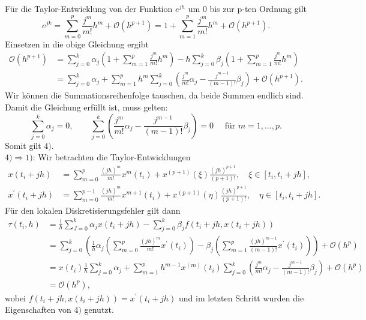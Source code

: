 Für die Taylor-Entwicklung von der Funktion $e^{jh}$ um $0$ bis zur p-ten Ordnung gilt
\[
    e^{jk} = \sum_{m=0}^{p} \frac{j^m}{m!}h^m + \mathcal{O}(h^{p+1})
    = 1 + \sum_{m=1}^{p} \frac{j^m}{m!}h^m + \mathcal{O}(h^{p+1}).
\]
Einsetzen in die obige Gleichung ergibt
\begin{align*}
    \mathcal{O}(h^{p+1})
    &= \sum_{j=0}^{k} \alpha_j  \left( 1 + \sum_{m=1}^{p} \frac{j^m}{m!}h^m \right)
    - h \sum_{j=0}^{k} \beta_j  \left( 1 + \sum_{m=1}^{p} \frac{j^m}{m!}h^m \right) \\
    &= \sum_{j=0}^{k}\alpha_j + \sum_{m=1}^{p} h^{m} \sum_{j=0}^{k}
    \left( \frac{j^m}{m!} \alpha_j - \frac{j^{m-1}}{(m-1)!}\beta_j \right) + \mathcal{O}(h^{p+1}).
\end{align*}
Wir können die Summationsreihenfolge tauschen, da beide Summen endlich sind. Damit die Gleichung erfüllt ist, muss
gelten:
\[
    \sum_{j=0}^{k} \alpha_j = 0, \qquad
    \sum_{j=0}^{k} \left( \frac{j^m}{m!}\alpha_j - \frac{j^{m-1}}{(m-1)!}\beta_j \right) = 0 \quad
    \text{ für } m = 1, \dots, p.
\]
Somit gilt $4)$.\\
$4) \Rightarrow 1)$: Wir betrachten die Taylor-Entwicklungen
\begin{align*}
    x(t_i + jh) &= \sum_{m=0}^{p} \frac{(jh)^m}{m!}x^{m}(t_i) + x^{(p+1)}(\xi)\frac{(jh)^{p+1}}{(p+1)!}, \quad
    \xi \in [t_i, t_i + jh], \\
    x^{\prime}(t_i + jh) &= \sum_{m=0}^{p-1} \frac{(jh)^m}{m!}x^{m+1}(t_i) + x^{(p+1)}(\eta)\frac{(jh)^{p+1}}{(p+1)!},
    \quad \eta \in [t_i, t_i + jh].
\end{align*}
Für den lokalen Diskretisierungsfehler gilt dann
\begin{align*}
    \tau(t_i,h) &= \frac{1}{h} \sum_{J=0}^{k} \alpha_j x(t_i + jh) - \sum_{j=0}^{k} \beta_j f(t_i+jh,x(t_i+jh))\\
    &= \sum_{j=0}^{k}\left( \frac{1}{h}\alpha_j \left( \sum_{m=0}^{p} \frac{(jh)^m}{m!}x^{\prime}(t_i)  \right)
    - \beta_j \left( \sum_{m=1}^{p} \frac{(jh)^{m-1}}{(m-1)!}x^{\prime}(t_i) \right) \right) + \mathcal{O}(h^p) \\
    &= x(t_i) \frac{1}{h} \sum_{j=0}^{k} \alpha_j + \sum_{m=1}^{p} h^{m-1} x^{(m
    )}(t_i)
    \sum_{j=0}^{k}\left( \frac{j^m}{m!} \alpha_j - \frac{j^{m-1}}{(m-1)!} \beta_j \right) + \mathcal{O}(h^p)\\
    &= \mathcal{O}(h^p),
\end{align*}
wobei $f(t_i+jh,x(t_i+jh)) = x^{\prime}(t_i+jh)$ und im letzten Schritt wurden die Eigenschaften von $4)$ genutzt.\\
